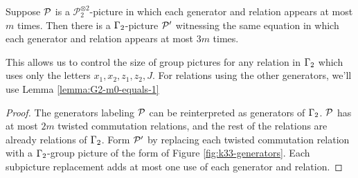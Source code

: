 \begin{lemma}\label{lemma:small-group-pictures-square}
	Suppose $\mathcal P$ is a $\mathcal{P}_2^{\otimes 2}$-picture in which each generator and relation appears at most $m$ times. Then there is a $\Gamma_2$-picture $\mathcal P'$ witnessing the same equation in which each generator and relation appears at most $3m$ times.
\end{lemma}
This allows us to control the size of group pictures for any relation in $\Gamma_2$ which uses only the letters $x_1,x_2,z_1,z_2,J$. For relations using the other generators, we'll use Lemma \ref{lemma:G2-m0-equals-1}
\begin{proof}
	The generators labeling $\mathcal P$ can be reinterpreted as generators of $\Gamma_2$. $\mathcal P$ has at most $2m$ twisted commutation relations, and the rest of the relations are already relations of $\Gamma_2$. Form $\mathcal P'$ by replacing each twisted commutation relation with a $\Gamma_2$-group picture of the form of Figure \ref{fig:k33-generators}. Each subpicture replacement adds at most one use of each generator and relation.
\end{proof}

